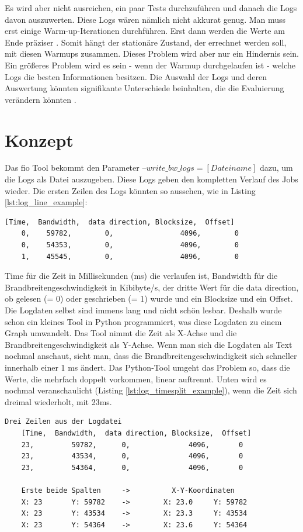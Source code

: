 \documentclass{article}
\begin{document}
Es wird aber nicht ausreichen, ein paar Tests durchzuführen und danach die Logs davon auszuwerten. Diese Logs wären nämlich nicht akkurat genug.
Man muss erst einige Warm-up-Iterationen durchführen. Erst dann werden die Werte am Ende präziser \cite{vmsHotandCold}. Somit hängt der stationäre Zustand, der errechnet werden soll, 
mit diesen Warmups zusammen. Dieses Problem wird aber nur ein Hindernis sein. Ein größeres Problem wird es sein - wenn der Warmup durchgelaufen ist -
welche Logs die besten Informationen besitzen. 
Die Auswahl der Logs und deren Auswertung könnten signifikante Unterschiede beinhalten, die die Evaluierung verändern könnten \cite{whenStopPerformanceTest}.

\newpage
\section{Konzept}
Das fio Tool bekommt den Parameter $\text{--} write\_bw\_logs = [Dateiname]$ dazu, um die Logs als Datei auszugeben.
Diese Logs geben den kompletten Verlauf des Jobs wieder. Die ersten Zeilen des Logs könnten so aussehen, wie in Listing \ref{lst:log_line_example}:
\bigskip
\begin{lstlisting}[caption=Erste Zeilen des Logs (Bezeichnungen sind nicht im Log enthalten),label={lst:log_line_example}]
    [Time,	Bandwidth,  data direction, Blocksize,	Offset]
    0, 	  59782,        0,		          4096,		   0
    0, 	  54353,        0,		          4096,		   0
    1, 	  45545,        0,		          4096,		   0
\end{lstlisting}
\bigskip
Time für die Zeit in Millisekunden (ms) die verlaufen ist, Bandwidth für die Brandbreitengeschwindigkeit in Kibibyte/s, 
der dritte Wert für die data direction, ob gelesen (= 0) oder geschrieben (= 1) wurde und ein Blocksize
und ein Offset. Die Logdaten selbst sind immens lang und nicht schön lesbar. Deshalb wurde schon ein kleines Tool in Python programmiert,
was diese Logdaten zu einem Graph umwandelt. 
Das Tool nimmt die Zeit als X-Achse und die Brandbreitengeschwindigkeit als Y-Achse.
Wenn man sich die Logdaten als Text nochmal anschaut, sieht man, dass die Brandbreitengeschwindigkeit sich schneller innerhalb einer 1 ms ändert.
Das Python-Tool umgeht das Problem so, dass die Werte, die mehrfach doppelt vorkommen, linear auftrennt.
Unten wird es nochmal veranschaulicht (Listing \ref{lst:log_timesplit_example}), wenn die Zeit sich dreimal wiederholt, mit 23ms.
\bigskip
\begin{lstlisting}[caption={Aufsplitten der Zeit um ein Grafik zu bilden}, label={lst:log_timesplit_example}]
    Drei Zeilen aus der Logdatei
    [Time,	Bandwidth,	data direction, Blocksize,	Offset]
    23, 	    59782, 		0,		        4096,		0
    23, 	    43534, 		0,		        4096,		0
    23, 	    54364, 		0,		        4096,		0

    Erste beide Spalten     ->          X-Y-Koordinaten
    X: 23       Y: 59782    ->        X: 23.0     Y: 59782
    X: 23       Y: 43534    ->        X: 23.3     Y: 43534
    X: 23       Y: 54364    ->        X: 23.6     Y: 54364
\end{lstlisting}
\end{document}
